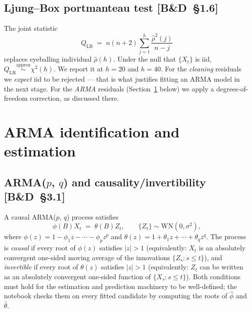 \documentclass[11pt,a4paper]{article}
\newcommand{\WN}{\mathrm{WN}}
\newcommand{\BD}[1]{\textsc{[B\&D~§#1]}}
\begin{document}
\subsection*{Ljung--Box portmanteau test \BD{1.6}}
The joint statistic
\begin{equation}
Q_{\mathrm{LB}} \;=\; n(n+2) \sum_{j=1}^{h} \frac{\hat\rho^2(j)}{n - j}
\end{equation}
replaces eyeballing individual $\hat\rho(h)$. Under the null that $\{X_t\}$ is
iid, $Q_{\mathrm{LB}} \overset{\text{approx}}{\sim} \chi^2(h)$. We report it at
$h = 20$ and $h = 40$. For the \emph{cleaning} residuals we \emph{expect} iid
to be rejected --- that is what justifies fitting an ARMA model in the next
stage. For the \emph{ARMA} residuals (Section~\ref{sec:arma} below) we apply
a degrees-of-freedom correction, as discussed there.

\section{ARMA identification and estimation}
\label{sec:arma}

\subsection*{ARMA($p$, $q$) and causality/invertibility \BD{3.1}}
A causal ARMA($p$, $q$) process satisfies
\begin{equation}
\phi(B) X_t \;=\; \theta(B) Z_t, \qquad \{Z_t\} \sim \WN(0, \sigma^2),
\label{eq:arma}
\end{equation}
where
$\phi(z) = 1 - \phi_1 z - \cdots - \phi_p z^p$ and
$\theta(z) = 1 + \theta_1 z + \cdots + \theta_q z^q$.
The process is \emph{causal} if every root of $\phi(z)$ satisfies $|z| > 1$
(equivalently: $X_t$ is an absolutely convergent one-sided moving average of the
innovations $\{Z_s : s \leq t\}$), and \emph{invertible} if every root of
$\theta(z)$ satisfies $|z| > 1$ (equivalently: $Z_t$ can be written as an
absolutely convergent one-sided function of $\{X_s : s \leq t\}$). Both
conditions must hold for the estimation and prediction machinery to be
well-defined; the notebook checks them on every fitted candidate by computing
the roots of $\hat\phi$ and $\hat\theta$.
\end{document}
